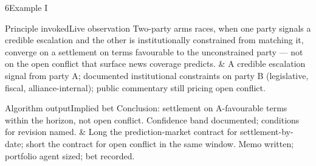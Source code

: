 \documentclass[10pt]{article}
\begin{document}
\begin{slide}{6}{Example I}
  \sliderule

  \begin{stack}{Principle invoked}{Live observation}
    Two-party arms races, when one party signals a credible escalation
    and the other is institutionally constrained from matching it,
    converge on a settlement on terms favourable to the unconstrained
    party --- not on the open conflict that surface news coverage
    predicts. &
    A credible escalation signal from party A; documented institutional
    constraints on party B (legislative, fiscal, alliance-internal);
    public commentary still pricing open conflict. \\
  \end{stack}

  \vspace{0.3in}

  \begin{stack}{Algorithm output}{Implied bet}
    Conclusion: settlement on A-favourable terms within the horizon,
    not open conflict. Confidence band documented; conditions for
    revision named. &
    Long the prediction-market contract for settlement-by-date;
    short the contract for open conflict in the same window. Memo
    written; portfolio agent sized; bet recorded. \\
  \end{stack}
\end{slide}
\end{document}
